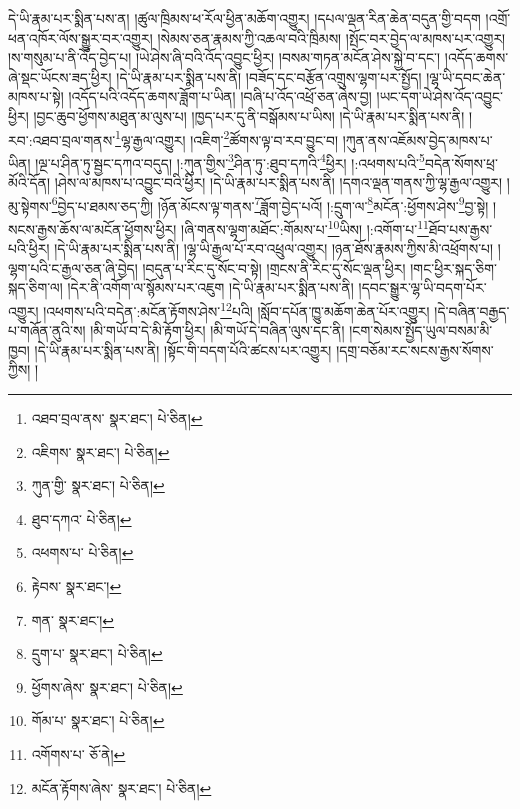 དེ་ཡི་རྣམ་པར་སྨིན་པས་ན། །ཚུལ་ཁྲིམས་ཕ་རོལ་ཕྱིན་མཆོག་འགྱུར། །དཔལ་ལྡན་རིན་ཆེན་བདུན་གྱི་བདག །འགྲོ་ཕན་འཁོར་ལོས་སྒྱུར་བར་འགྱུར། །སེམས་ཅན་རྣམས་ཀྱི་འཆལ་བའི་ཁྲིམས། །སྤོང་བར་བྱེད་ལ་མཁས་པར་འགྱུར། །ས་གསུམ་པ་ནི་འོད་བྱེད་པ། །ཡེ་ཤེས་ཞི་བའི་འོད་འབྱུང་ཕྱིར། །བསམ་གཏན་མངོན་ཤེས་སྐྱེ་བ་དང་། །འདོད་ཆགས་ཞེ་སྡང་ཡོངས་ཟད་ཕྱིར། །དེ་ཡི་རྣམ་པར་སྨིན་པས་ནི། །བཟོད་དང་བརྩོན་འགྲུས་ལྷག་པར་སྤྱོད། །ལྷ་ཡི་དབང་ཆེན་མཁས་པ་སྟེ། །འདོད་པའི་འདོད་ཆགས་ཟློག་པ་ཡིན། །བཞི་པ་འོད་འཕྲོ་ཅན་ཞེས་བྱ། །ཡང་དག་ཡེ་ཤེས་འོད་འབྱུང་ཕྱིར། །བྱང་ཆུབ་ཕྱོགས་མཐུན་མ་ལུས་པ། །ཁྱད་པར་དུ་ནི་བསྒོམས་པ་ཡིས། །དེ་ཡི་རྣམ་པར་སྨིན་པས་ནི། །རབ་:འཐབ་བྲལ་གནས་\footnote{འཐབ་བྲལ་ནས་  སྣར་ཐང་།  པེ་ཅིན། }ལྷ་རྒྱལ་འགྱུར། །འཇིག་\footnote{འཇིགས་  སྣར་ཐང་།  པེ་ཅིན། }ཚོགས་ལྟ་བ་རབ་བྱུང་བ། །ཀུན་ནས་འཇོམས་བྱེད་མཁས་པ་ཡིན། །ལྔ་པ་ཤིན་ཏུ་སྦྱང་དཀའ་བདུད། །:ཀུན་གྱིས་\footnote{ཀུན་གྱི་  སྣར་ཐང་།  པེ་ཅིན། }ཤིན་ཏུ་:ཐུབ་དཀའི་\footnote{ཐུབ་དཀའ་  པེ་ཅིན། }ཕྱིར། །:འཕགས་པའི་\footnote{འཕགས་པ་  པེ་ཅིན། }བདེན་སོགས་ཕྲ་མོའི་དོན། །ཤེས་ལ་མཁས་པ་འབྱུང་བའི་ཕྱིར། །དེ་ཡི་རྣམ་པར་སྨིན་པས་ནི། །དགའ་ལྡན་གནས་ཀྱི་ལྷ་རྒྱལ་འགྱུར། །མུ་སྟེགས་\footnote{རྟེབས་  སྣར་ཐང་། }བྱེད་པ་ཐམས་ཅད་ཀྱི། །ཉོན་མོངས་ལྟ་གནས་\footnote{གན་  སྣར་ཐང་། }ཟློག་བྱེད་པའོ། །:དྲུག་ལ་\footnote{དྲུག་པ་  སྣར་ཐང་།  པེ་ཅིན། }མངོན་:ཕྱོགས་ཤེས་\footnote{ཕྱོགས་ཞེས་  སྣར་ཐང་།  པེ་ཅིན། }བྱ་སྟེ། །སངས་རྒྱས་ཆོས་ལ་མངོན་ཕྱོགས་ཕྱིར། །ཞི་གནས་ལྷག་མཐོང་:གོམས་པ་\footnote{གོམ་པ་  སྣར་ཐང་།  པེ་ཅིན། }ཡིས། །:འགོག་པ་\footnote{འགོགས་པ་  ཅོ་ནེ། }ཐོབ་པས་རྒྱས་པའི་ཕྱིར། །དེ་ཡི་རྣམ་པར་སྨིན་པས་ནི། །ལྷ་ཡི་རྒྱལ་པོ་རབ་འཕྲུལ་འགྱུར། །ཉན་ཐོས་རྣམས་ཀྱིས་མི་འཕྲོགས་པ། །ལྷག་པའི་ང་རྒྱལ་ཅན་ཞི་བྱེད། །བདུན་པ་རིང་དུ་སོང་བ་སྟེ། །གྲངས་ནི་རིང་དུ་སོང་ལྡན་ཕྱིར། །གང་ཕྱིར་སྐད་ཅིག་སྐད་ཅིག་ལ། །དེར་ནི་འགོག་ལ་སྙོམས་པར་འཇུག །དེ་ཡི་རྣམ་པར་སྨིན་པས་ནི། །དབང་སྒྱུར་ལྷ་ཡི་བདག་པོར་འགྱུར། །འཕགས་པའི་བདེན་:མངོན་རྟོགས་ཤེས་\footnote{མངོན་རྟོགས་ཞེས་  སྣར་ཐང་།  པེ་ཅིན། }པའི། །སློབ་དཔོན་ཁྱུ་མཆོག་ཆེན་པོར་འགྱུར། །དེ་བཞིན་བརྒྱད་པ་གཞོན་ནུའི་ས། །མི་གཡོ་བ་དེ་མི་རྟོག་ཕྱིར། །མི་གཡོ་དེ་བཞིན་ལུས་དང་ནི། །ངག་སེམས་སྤྱོད་ཡུལ་བསམ་མི་ཁྱབ། །དེ་ཡི་རྣམ་པར་སྨིན་པས་ནི། །སྟོང་གི་བདག་པོའི་ཚངས་པར་འགྱུར། །དགྲ་བཅོམ་རང་སངས་རྒྱས་སོགས་ཀྱིས། །
